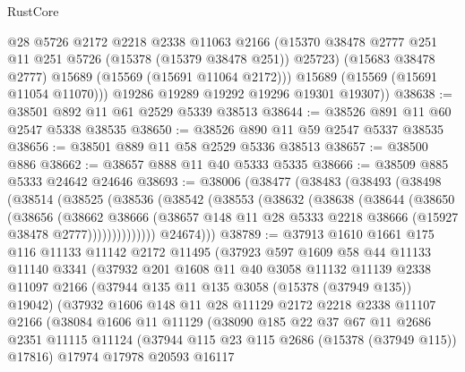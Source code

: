 \begin{lexlean}{RustCore}
\begin{coremodule}
            @28
            @5726
            @2172
            @2218
            @2338
            @11063
            @2166
            (@15370 @38478 @2777 @251 @11 @251 @5726 (@15378 (@15379 @38478 @251)) @25723)
            (@15683 @38478 @2777)
            @15689
            (@15569 (@15691 @11064 @2172)))
          @15689
          (@15569 (@15691 @11054 @11070)))
        @19286
        @19289
        @19292
        @19296
        @19301
        @19307))
@38638 := @38501 @892 @11 @61 @2529 @5339 @38513
@38644 := @38526 @891 @11 @60 @2547 @5338 @38535
@38650 := @38526 @890 @11 @59 @2547 @5337 @38535
@38656 := @38501 @889 @11 @58 @2529 @5336 @38513
@38657 := @38500 @886
@38662 := @38657 @888 @11 @40 @5333 @5335
@38666 := @38509 @885 @5333 @24642 @24646
@38693 := @38006
    (@38477
      (@38483
        (@38493
          (@38498
            (@38514
              (@38525
                (@38536
                  (@38542
                    (@38553
                      (@38632
                        (@38638
                          (@38644
                            (@38650
                              (@38656
                                (@38662
                                  @38666
                                  (@38657
                                    @148
                                    @11
                                    @28
                                    @5333
                                    @2218
                                    @38666
                                    (@15927 @38478 @2777))))))))))))))
          @24674)))
@38789 := @37913
    @1610
    @1661
    @175
    @116
    @11133
    @11142
    @2172
    @11495
    (@37923
      @597
      @1609
      @58
      @44
      @11133
      @11140
      @3341
      (@37932
        @201
        @1608
        @11
        @40
        @3058
        @11132
        @11139
        @2338
        @11097
        @2166
        (@37944 @135 @11 @135 @3058 (@15378 (@37949 @135)) @19042)
        (@37932
          @1606
          @148
          @11
          @28
          @11129
          @2172
          @2218
          @2338
          @11107
          @2166
          (@38084
            @1606
            @11
            @11129
            (@38090
              @185
              @22
              @37
              @67
              @11
              @2686
              @2351
              @11115
              @11124
              (@37944 @115 @23 @115 @2686 (@15378 (@37949 @115)) @17816)
              @17974
              @17978
              @20593
              @16117

\end{coremodule}
\end{lexlean}
